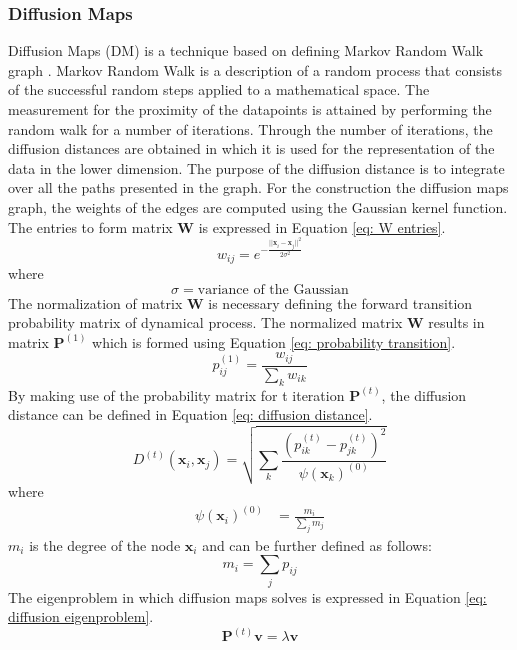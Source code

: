\documentclass[11pt,twocolumn]{witseiepaper}
\begin{document}
	\subsubsection{Diffusion Maps}
	Diffusion Maps (DM) is a technique based on defining Markov Random Walk graph \cite{COIFMAN20065}. Markov Random Walk is a description of a random process that consists of the successful random steps applied to a mathematical space. The measurement for the proximity of the datapoints is attained by performing the random walk for a number of iterations. Through the number of iterations, the diffusion distances are obtained in which it is used for the representation of the data in the lower dimension. The purpose of the diffusion distance is to integrate over all the paths presented in the graph. For the construction the diffusion maps graph, the weights of the edges are computed using the Gaussian kernel function. The entries to form matrix \textbf{W} is expressed in Equation \ref{eq: W entries}.
	\begin{equation}
		w_{ij} = e^{-\frac{||\textbf{x}_i - \textbf{x}_j||^2}{2\sigma^2}}
		\label{eq: W entries}
	\end{equation}
	where
	\[\sigma = \text{variance of the Gaussian}\]
	The normalization of matrix \textbf{W} is necessary defining the forward transition probability matrix of dynamical process. The normalized matrix \textbf{W} results in matrix $\textbf{P}^{(1)}$ which is formed using Equation \ref{eq: probability transition}.
	\begin{equation}
		p_{ij}^{(1)} = \frac{w_{ij}}{\sum_{k}w_{ik}}
		\label{eq: probability transition}
	\end{equation}
	By making use of the probability matrix for t iteration $\textbf{P}^{(t)}$, the diffusion distance can be defined in Equation \ref{eq: diffusion distance}.
	\begin{equation}
		D^{(t)}(\textbf{x}_i, \textbf{x}_j) = \sqrt{\sum_{k}\frac{(p_{ik}^{(t)}-p_{jk}^{(t)})^2}{\psi(\textbf{x}_k)^{(0)}}}
		\label{eq: diffusion distance}
	\end{equation}
	where
	\begin{align*}
		\psi(\textbf{x}_i)^{(0)} &= \frac{m_i}{\sum_{j}m_j}
	\end{align*}
	$m_i$ is the degree of the node $\textbf{x}_i$ and can be further defined as follows:
	\[m_i = \sum_{j}p_{ij}\]
	The eigenproblem in which diffusion maps solves is expressed in Equation \ref{eq: diffusion eigenproblem}. 
	\begin{equation}
		\textbf{P}^{(t)}\textbf{v} = \lambda\textbf{v}
		\label{eq: diffusion eigenproblem}
	\end{equation}
\end{document}

